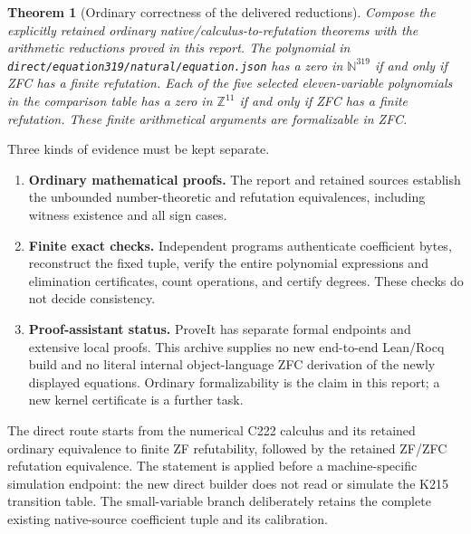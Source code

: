 \documentclass[11pt]{article}
\newcommand{\N}{\mathbb N}
\newcommand{\Z}{\mathbb Z}
\newcommand{\code}[1]{\texttt{\small #1}}
\newtheorem{theorem}{Theorem}[section]
\theoremstyle{definition}\newtheorem{definition}[theorem]{Definition}
\theoremstyle{remark}\newtheorem{remark}[theorem]{Remark}
\begin{document}
\begin{theorem}[Ordinary correctness of the delivered reductions]
Compose the explicitly retained ordinary native/calculus-to-refutation
theorems with the arithmetic reductions proved in this report. The
polynomial in \code{direct/equation319/natural/equation.json} has a zero in $\N^{319}$
if and only if ZFC has a finite refutation. Each of the five selected
eleven-variable polynomials in the comparison table has a zero in
$\Z^{11}$ if and only if ZFC has a finite refutation. These finite
arithmetical arguments are formalizable in ZFC.
\end{theorem}

Three kinds of evidence must be kept separate.
\begin{enumerate}
\item \textbf{Ordinary mathematical proofs.} The report and retained
sources establish the unbounded number-theoretic and refutation
equivalences, including witness existence and all sign cases.
\item \textbf{Finite exact checks.} Independent programs authenticate
coefficient bytes, reconstruct the fixed tuple, verify the entire
polynomial expressions and elimination certificates, count operations,
and certify degrees. These checks do not decide consistency.
\item \textbf{Proof-assistant status.} ProveIt has separate formal
endpoints and extensive local proofs. This archive supplies no new
end-to-end Lean/Rocq build and no literal internal object-language ZFC
derivation of the newly displayed equations. Ordinary formalizability
is the claim in this report; a new kernel certificate is a further task.
\end{enumerate}

The direct route starts from the numerical C222 calculus and its retained
ordinary equivalence to finite ZF refutability, followed by the retained
ZF/ZFC refutation equivalence. The statement is applied before a
machine-specific simulation endpoint: the new direct builder does not
read or simulate the K215 transition table. The small-variable branch
deliberately retains the complete existing native-source coefficient
tuple and its calibration.


\clearpage

\clearpage

\clearpage

\end{document}
